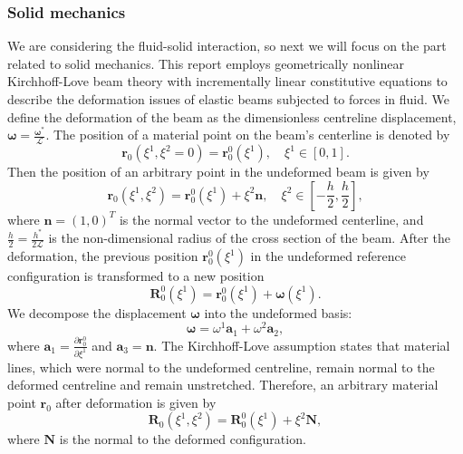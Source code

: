 \documentclass[lineno]{JFM-FLM_Au}
\begin{document}
\subsubsection{Solid mechanics}
We are considering the fluid-solid interaction, so next we will focus on the part related to solid mechanics. This report employs geometrically nonlinear Kirchhoff-Love beam theory with incrementally linear constitutive equations to describe the deformation issues of elastic beams subjected to forces in fluid. We define the deformation of the beam as the dimensionless centreline displacement, $\mathbf{\omega} = \frac{\mathbf{\omega}^*}{\mathcal{L}}$. The position of a material point on the beam's centerline is denoted by 
\begin{equation}
	\label{eqn:61}
	\mathbf{r}_0(\xi^1, \xi^2=0)=\mathbf{r}^0_0(\xi^1),\quad \xi^1\in [0,1].
\end{equation}
Then the position of an arbitrary point in the undeformed beam is given by 
\begin{equation}
	\label{eqn:62}
	\mathbf{r}_0(\xi^1, \xi^2)=\mathbf{r}^0_0(\xi^1)+\xi^2\mathbf{n},\quad \xi^2\in [-\frac{h}{2},\frac{h}{2}],
\end{equation}
where $\mathbf{n}=(1,0)^T$ is the normal vector to the undeformed centerline, and $\frac{h}{2}=\frac{h^*}{2\mathcal{L}}$ is the non-dimensional radius of the cross section of the beam. After the deformation, the previous position $\mathbf{r}^0_0(\xi^1)$ in the undeformed reference configuration is transformed to a new position 
\begin{equation}
	\label{eqn:63}
	\mathbf{R}^0_0(\xi^1)=\mathbf{r}^0_0(\xi^1)+\mathbf{\omega}(\xi^1).
\end{equation}
We decompose the displacement $\mathbf{\omega}$ into the undeformed basis:
\begin{equation}
	\label{eqn:64}
	\mathbf{\omega}=\omega^1\mathbf{a}_1+\omega^2\mathbf{a}_2,
\end{equation}
where $\mathbf{a}_1=\frac{\partial \mathbf{r}^0_0}{\partial\xi^1}$ and $\mathbf{a}_3=\mathbf{n}$. The Kirchhoff-Love assumption states that material lines, which were normal to the undeformed centreline, remain normal to the deformed centreline and remain unstretched. Therefore, an arbitrary material point $\mathbf{r}_0$ after deformation is given by 
\begin{equation}
	\label{eqn:65}
	\mathbf{R}_0(\xi^1,\xi^2)=\mathbf{R}^0_0(\xi^1)+\xi^2\mathbf{N},
\end{equation}
where $\mathbf{N}$ is the normal to the deformed configuration.
\end{document}
